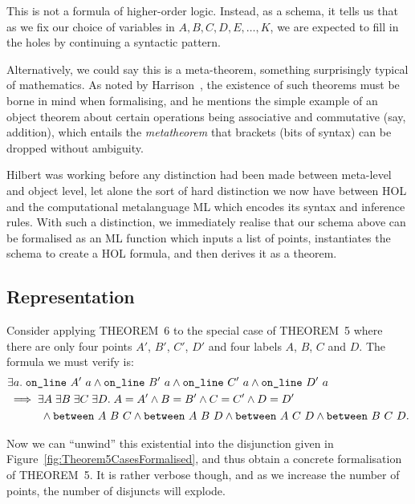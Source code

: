 This is not a formula of higher-order logic. Instead, as a schema, it tells us that as we fix our choice of variables in $A, B, C, D, E, \ldots, K$, we are expected to fill in the holes by continuing a syntactic pattern.

Alternatively, we could say this is a meta-theorem, something surprisingly typical of mathematics. As noted by Harrison~\cite{FormalizedMathematics}, the existence of such theorems must be borne in mind when formalising, and he mentions the simple example of an object theorem about certain operations being associative and commutative (say, addition), which entails the \emph{metatheorem} that brackets (bits of syntax) can be dropped without ambiguity.

Hilbert was working before any distinction had been made between meta-level and object level, let alone the sort of hard distinction we now have between HOL and the computational metalanguage ML which encodes its syntax and inference rules. With such a distinction, we immediately realise that our schema above can be formalised as an ML function which inputs a list of points, instantiates the schema to create a HOL formula, and then derives it as a theorem.

\subsection{Representation}
Consider applying THEOREM~6 to the special case of THEOREM~5 where there are only four points $A'$, $B'$, $C'$, $D'$ and four labels $A$, $B$, $C$ and $D$. The formula we must verify is:
\begin{equation*}
  \begin{split}
    &\exists a.\;\code{on\_line}\ A'\ a\wedge\code{on\_line}\ B'\ a\wedge\code{on\_line}\ C'\ a\wedge\code{on\_line}\ D'\ a\\
    &\implies\exists A\;\exists B\;\exists C\;\exists D.\; A = A' \wedge B = B' \wedge C = C' \wedge D = D'\\
    &\qquad\quad\wedge\between{A}{B}{C} \wedge \between{A}{B}{D}\wedge\between{A}{C}{D}\wedge\between{B}{C}{D}.
  \end{split}
\end{equation*} 

Now we can ``unwind'' this existential into the disjunction given in Figure~\ref{fig:Theorem5CasesFormalised}, and thus obtain a concrete formalisation of THEOREM~5. It is rather verbose though, and as we increase the number of points, the number of disjuncts will explode. 

